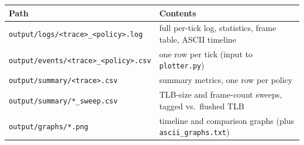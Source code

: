 \documentclass[11pt]{article}
\begin{document}
\begin{table}[H]\centering\small
\begin{tabularx}{\linewidth}{lX}
\toprule
Path & Contents \\
\midrule
\texttt{output/logs/<trace>\_<policy>.log} & full per-tick log, statistics, frame table, ASCII timeline \\
\texttt{output/events/<trace>\_<policy>.csv} & one row per tick (input to \texttt{plotter.py}) \\
\texttt{output/summary/<trace>.csv} & summary metrics, one row per policy \\
\texttt{output/summary/*\_sweep.csv} & TLB-size and frame-count sweeps, tagged vs.\ flushed TLB \\
\texttt{output/graphs/*.png} & timeline and comparison graphs (plus \texttt{ascii\_graphs.txt}) \\
\bottomrule
\end{tabularx}
\end{table}
\end{document}
